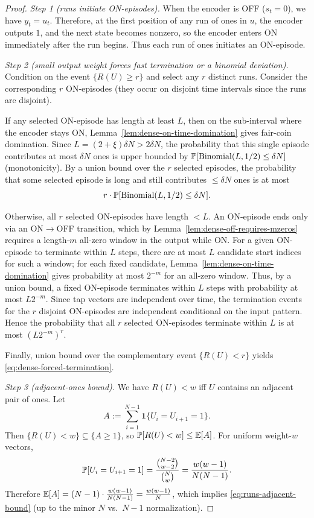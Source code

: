 \begin{proof}
\emph{Step 1 (runs initiate ON-episodes).}
When the encoder is OFF ($s_t=0$), we have $y_t=u_t$.
Therefore, at the first position of any run of ones in $u$, the encoder outputs $1$, and the next state becomes nonzero,
so the encoder enters ON immediately after the run begins.
Thus each run of ones initiates an ON-episode.

\emph{Step 2 (small output weight forces fast termination or a binomial deviation).}
Condition on the event $\{R(U)\ge r\}$ and select any $r$ distinct runs.
Consider the corresponding $r$ ON-episodes (they occur on disjoint time intervals since the runs are disjoint).

If any selected ON-episode has length at least $L$, then on the sub-interval where the encoder stays ON,
Lemma~\ref{lem:dense-on-time-domination} gives fair-coin domination.
Since $L=(2+\xi)\delta N>2\delta N$, the probability that this single episode contributes at most $\delta N$ ones is
upper bounded by $\mathbb{P}[\mathrm{Binomial}(L,1/2)\le \delta N]$ (monotonicity).
By a union bound over the $r$ selected episodes, the probability that some selected episode is long and still contributes
$\le \delta N$ ones is at most
\[
r\cdot \mathbb{P}[\mathrm{Binomial}(L,1/2)\le \delta N].
\]

Otherwise, all $r$ selected ON-episodes have length $<L$.
An ON-episode ends only via an ON$\to$OFF transition, which by Lemma~\ref{lem:dense-off-requires-mzeros} requires a
length-$m$ all-zero window in the output while ON.
For a given ON-episode to terminate within $L$ steps, there are at most $L$ candidate start indices for such a window;
for each fixed candidate, Lemma~\ref{lem:dense-on-time-domination} gives probability at most \(2^{-m}\) for an
all-zero window.
Thus, by a union bound, a fixed ON-episode terminates within $L$ steps with probability at most $L2^{-m}$.
Since tap vectors are independent over time, the termination events for the $r$ disjoint ON-episodes are independent
conditional on the input pattern. Hence the probability that all $r$ selected ON-episodes terminate within $L$ is
at most $(L2^{-m})^r$.

Finally, union bound over the complementary event $\{R(U)<r\}$ yields \eqref{eq:dense-forced-termination}.

\emph{Step 3 (adjacent-ones bound).}
We have $R(U)<w$ iff $U$ contains an adjacent pair of ones.
Let
\[
A:=\sum_{i=1}^{N-1}\mathbf{1}\{U_i=U_{i+1}=1\}.
\]
Then $\{R(U)<w\}\subseteq\{A\ge 1\}$, so $\mathbb{P}[R(U)<w]\le \mathbb{E}[A]$.
For uniform weight-$w$ vectors,
\[
\mathbb{P}[U_i=U_{i+1}=1]=\frac{\binom{N-2}{w-2}}{\binom{N}{w}}=\frac{w(w-1)}{N(N-1)}.
\]
Therefore $\mathbb{E}[A]=(N-1)\cdot \frac{w(w-1)}{N(N-1)}=\frac{w(w-1)}{N}$, which implies \eqref{eq:runs-adjacent-bound}
(up to the minor $N$ vs.\ $N-1$ normalization).
\end{proof}

